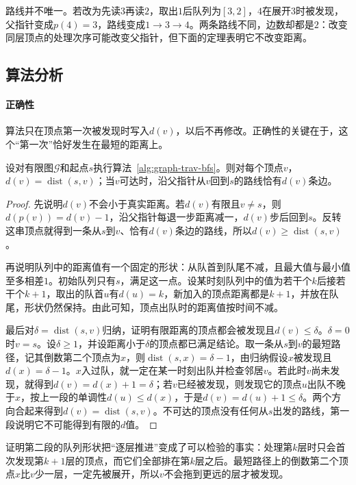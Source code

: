 路线并不唯一。若改为先读$3$再读$2$，取出$1$后队列为$[3,2]$，$4$在展开$3$时被发现，父指针变成$p(4)=3$，路线变成$1\to3\to4$。两条路线不同，边数却都是$2$：改变同层顶点的处理次序可能改变父指针，但下面的定理表明它不改变距离。

\subsection{算法分析}
\label{sec:graph-trav-bfs-correctness}

\paragraph{正确性}
算法只在顶点第一次被发现时写入$d(v)$，以后不再修改。正确性的关键在于，这个“第一次”恰好发生在最短的距离上。

\begin{theorem}[广度优先遍历的距离]
\label{thm:graph-trav-bfs-distance}
设对有限图$\mathcal G$和起点$s$执行算法~\ref{alg:graph-trav-bfs}。则对每个顶点$v$，$d(v)=\operatorname{dist}(s,v)$；当$v$可达时，沿父指针从$v$回到$s$的路线恰有$d(v)$条边。
\end{theorem}

\begin{proof}
先说明$d(v)$不会小于真实距离。若$d(v)$有限且$v\neq s$，则$d(p(v))=d(v)-1$，沿父指针每退一步距离减一，$d(v)$步后回到$s$。反转这串顶点就得到一条从$s$到$v$、恰有$d(v)$条边的路线，所以$d(v)\geq\operatorname{dist}(s,v)$。

再说明队列中的距离值有一个固定的形状：从队首到队尾不减，且最大值与最小值至多相差$1$。初始队列只有$s$，满足这一点。设某时刻队列中的值为若干个$k$后接若干个$k+1$，取出的队首$u$有$d(u)=k$，新加入的顶点距离都是$k+1$，并放在队尾，形状仍然保持。由此可知，顶点出队时的距离值按时间不减。

最后对$\delta=\operatorname{dist}(s,v)$归纳，证明有限距离的顶点都会被发现且$d(v)\leq\delta$。$\delta=0$时$v=s$。设$\delta\geq1$，并设距离小于$\delta$的顶点都已满足结论。取一条从$s$到$v$的最短路径，记其倒数第二个顶点为$x$，则$\operatorname{dist}(s,x)=\delta-1$，由归纳假设$x$被发现且$d(x)=\delta-1$。$x$入过队，就一定在某一时刻出队并检查邻居$v$。若此时$v$尚未发现，就得到$d(v)=d(x)+1=\delta$；若$v$已经被发现，则发现它的顶点$u$出队不晚于$x$，按上一段的单调性$d(u)\leq d(x)$，于是$d(v)=d(u)+1\leq\delta$。两个方向合起来得到$d(v)=\operatorname{dist}(s,v)$。不可达的顶点没有任何从$s$出发的路线，第一段说明它不可能得到有限的$d$值。
\end{proof}

证明第二段的队列形状把“逐层推进”变成了可以检验的事实：处理第$k$层时只会首次发现第$k+1$层的顶点，而它们全部排在第$k$层之后。最短路径上的倒数第二个顶点$x$比$v$少一层，一定先被展开，所以$v$不会拖到更远的层才被发现。

